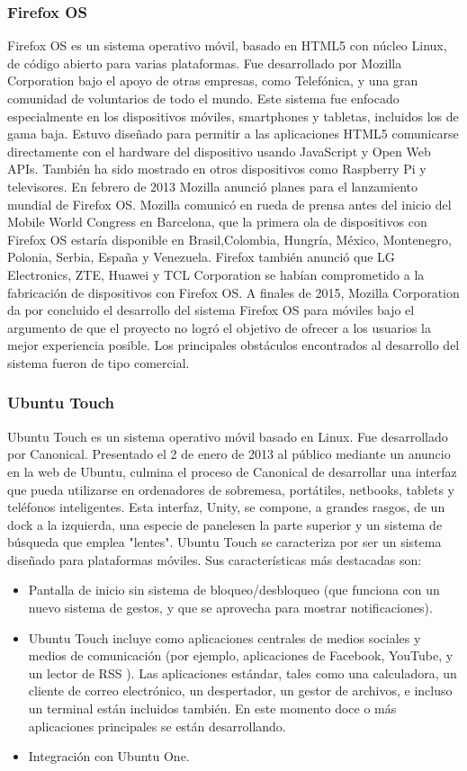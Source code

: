\subsubsection{Firefox OS}
Firefox OS es un sistema operativo móvil, basado en HTML5 con núcleo Linux, de código abierto para varias plataformas. Fue desarrollado por Mozilla Corporation bajo el apoyo de otras empresas, como Telefónica, y una gran comunidad de voluntarios de todo el mundo. Este sistema fue enfocado especialmente en los dispositivos móviles, smartphones y tabletas, incluidos los de gama baja. Estuvo diseñado para permitir a las aplicaciones HTML5 comunicarse directamente con el hardware del dispositivo usando JavaScript y Open Web APIs. También ha sido mostrado en otros dispositivos como Raspberry Pi y televisores.
En febrero de 2013 Mozilla anunció planes para el lanzamiento mundial de Firefox OS. Mozilla comunicó en rueda de prensa antes del inicio del Mobile World Congress en Barcelona, que la primera ola de dispositivos con Firefox OS estaría disponible en Brasil,Colombia, Hungría, México, Montenegro, Polonia, Serbia, España y Venezuela. Firefox también anunció que LG Electronics, ZTE, Huawei y TCL Corporation se habían comprometido a la fabricación de dispositivos con Firefox OS.
A finales de 2015, Mozilla Corporation da por concluido el desarrollo del sistema Firefox OS para móviles bajo el argumento de que el proyecto no logró el objetivo de ofrecer a los usuarios la mejor experiencia posible. Los principales obstáculos encontrados al desarrollo del sistema fueron de tipo comercial.

\subsubsection{Ubuntu Touch}
Ubuntu Touch es un sistema operativo móvil basado en Linux. Fue desarrollado por Canonical. Presentado el 2 de enero de 2013 al público mediante un anuncio en la web de Ubuntu, culmina el proceso de Canonical de desarrollar una interfaz que pueda utilizarse en ordenadores de sobremesa, portátiles, netbooks, tablets y teléfonos inteligentes. Esta interfaz, Unity, se compone, a grandes rasgos, de un dock a la izquierda, una especie de panelesen la parte superior y un sistema de búsqueda que emplea "lentes".
Ubuntu Touch se caracteriza por ser un sistema diseñado para plataformas móviles. 
Sus características más destacadas son:
\begin{itemize}
	 \item Pantalla de inicio sin sistema de bloqueo/desbloqueo (que funciona con un nuevo sistema de gestos, y que se aprovecha para mostrar notificaciones).
 	 \item Ubuntu Touch incluye como aplicaciones centrales de medios sociales y medios de comunicación (por ejemplo, aplicaciones de Facebook, YouTube, y un lector de RSS ). Las aplicaciones estándar, tales como una calculadora, un cliente de correo electrónico, un despertador, un gestor de archivos, e incluso un terminal están incluidos también. En este momento doce o más aplicaciones principales se están desarrollando.
 	 \item Integración con Ubuntu One.
\end{itemize}


